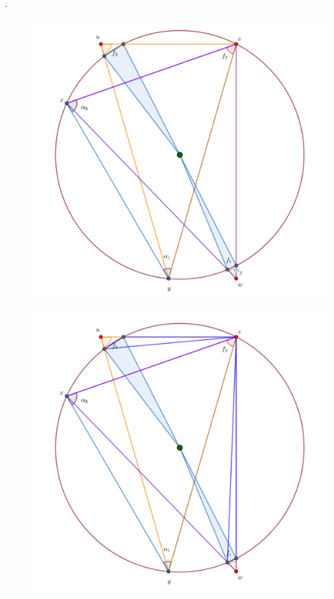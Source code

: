 {\begin{frame}
 .
\end{frame} 


\begin{frame}
  \begin{figure}
    \centering
    \includegraphics[width=.65 \paperwidth]{./images/Bosquejo11.png}
  \end{figure}
\end{frame} 

\begin{frame}
  \begin{figure}
    \centering
    \includegraphics[width=.65 \paperwidth]{./images/Bosquejo12.png}
  \end{figure}
\end{frame} 

}
